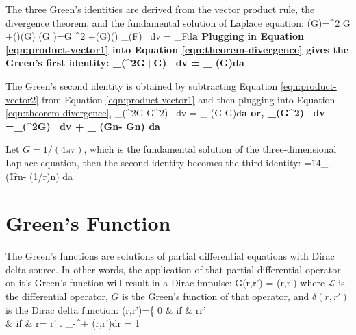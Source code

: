 The three Green's identities are derived from the vector product rule, the divergence theorem, and the fundamental solution of Laplace equation\cite{Green1828,Cheng05}:
\be
\n\cd(\Phi\n G)=\Phi \n^2 G +(\n \Phi)\cd(\n G)
\label{eqn:product-vector1}
\ee
\be
\n\cd(G \n \Phi)=G \n^2 \Phi +(\n G)\cd(\n \Phi)
\label{eqn:product-vector2}
\ee
\be
\int_{\Omega}(\n\cd F) \ dv = \int_{\p \Omega}F\cd d\bf{a}
\label{eqn:theorem-divergence}
\ee
Plugging in Equation \ref{eqn:product-vector1} into Equation \ref{eqn:theorem-divergence} gives the Green's first identity:
\be
\int_{\Omega}(\Phi\n^2G+\n \Phi \cd \n G) \ dv = \int_{\p \Omega} (\Phi\n G)\cd d\bf{a}
\ee

The Green's second identity is obtained by
subtracting Equation \ref{eqn:product-vector2} from Equation \ref{eqn:product-vector1} and then plugging into Equation \ref{eqn:theorem-divergence},
\be
\int_{\Omega}(\Phi\n^2G-G\n^2\Phi) \ dv = \int_{\p \Omega} (\Phi\n G-G\n\Phi)\cd d\bf{a}
\ee
or,
\be
\int_{\Omega}(G\n^2\Phi) \ dv  =\int_{\Omega}(\Phi\n^2G) \ dv + \int_{\p \Omega} (G\f{\p\Phi}{\p n}-\Phi\f{ \p G}{\p n}) da
\label{eqn:GreenSecondIdentity}
\ee

Let $G=1/(4\pi r)$, which is the fundamental solution of the three-dimensional Laplace equation, then the second identity becomes the third identity:
\be
\Phi=\f{1}{4\pi}\int_{\p \Omega} (\f{1}{r}\f{\p\Phi}{\p n}-\Phi\f{ \p (1/r)}{\p n}) da
\ee

\section{Green's Function}
\label{subsection:GreenFunction}

The Green's functions are solutions of partial differential equations with Dirac delta source. In other words, the application of that partial differential operator on it's Green's function will result in a Dirac impulse:
\be
{} G(r,r') = \delta(r,r')
\ee
where $\mathcal{L}$ is the differential operator, $G$ is the Green's function of that operator, and $\delta(r,r')$ is the Dirac delta function:
\be
\delta(r,r')=\left\{
0 \hst & if & r\neq r' \\
\infty \hst & if & r= r'
\eaa
\right.
\ee
\be
\int_{-\infty}^{+\infty} \delta(r,r')dr = 1
\ee

